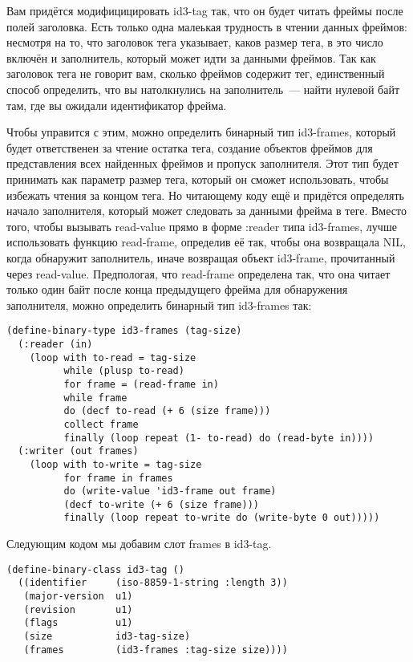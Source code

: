 Вам придётся модифицицировать id3-tag так, что он будет читать фреймы после полей
заголовка. Есть только одна малеькая трудность в чтении данных фреймов: несмотря на то,
что заголовок тега указывает, каков размер тега, в это число включён и заполнитель,
который может идти за данными фреймов. Так как заголовок тега не говорит вам, сколько
фреймов содержит тег, единственный способ определить, что вы натолкнулись на
заполнитель~--- найти нулевой байт там, где вы ожидали идентификатор фрейма.

Чтобы управится с этим, можно определить бинарный тип id3-frames, который будет
ответственен за чтение остатка тега, создание объектов фреймов для представления всех
найденных фреймов и пропуск заполнителя. Этот тип будет принимать как параметр размер
тега, который он сможет использовать, чтобы избежать чтения за концом тега. Но читающему
коду ещё и придётся определять начало заполнителя, который может следовать за данными
фрейма в теге. Вместо того, чтобы вызывать read-value прямо в форме :reader типа
id3-frames, лучше использовать функцию read-frame, определив её так, чтобы она возвращала
NIL, когда обнаружит заполнитель, иначе возвращая объект id3-frame, прочитанный через
read-value. Предпологая, что read-frame определена так, что она читает только один байт
после конца предыдущего фрейма для обнаружения заполнителя, можно определить бинарный тип
id3-frames так:

\begin{lstlisting}
(define-binary-type id3-frames (tag-size)
  (:reader (in)
    (loop with to-read = tag-size
          while (plusp to-read)
          for frame = (read-frame in)
          while frame
          do (decf to-read (+ 6 (size frame)))
          collect frame
          finally (loop repeat (1- to-read) do (read-byte in))))
  (:writer (out frames)
    (loop with to-write = tag-size
          for frame in frames
          do (write-value 'id3-frame out frame)
          (decf to-write (+ 6 (size frame)))
          finally (loop repeat to-write do (write-byte 0 out)))))
\end{lstlisting}

Следующим кодом мы добавим слот frames в id3-tag.

\begin{lstlisting}
(define-binary-class id3-tag ()
  ((identifier     (iso-8859-1-string :length 3))
   (major-version  u1)
   (revision       u1)
   (flags          u1)
   (size           id3-tag-size)
   (frames         (id3-frames :tag-size size))))
\end{lstlisting}

